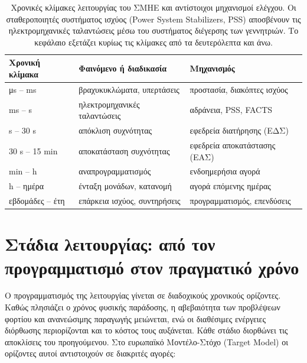 \begin{table}[!htbp]
\centering
\begin{tabular}{lll}
\hline
Χρονική κλίμακα & Φαινόμενο ή διαδικασία & Μηχανισμός \\
\hline
μs -- ms   & βραχυκυκλώματα, υπερτάσεις   & προστασία, διακόπτες ισχύος \\
ms -- s    & ηλεκτρομηχανικές ταλαντώσεις & αδράνεια, PSS, FACTS \\
s -- 30 s  & απόκλιση συχνότητας          & εφεδρεία διατήρησης (ΕΔΣ) \\
30 s -- 15 min & αποκατάσταση συχνότητας  & εφεδρεία αποκατάστασης (ΕΑΣ) \\
min -- h   & αναπρογραμματισμός           & ενδοημερήσια αγορά \\
h -- ημέρα & ένταξη μονάδων, κατανομή     & αγορά επόμενης ημέρας \\
εβδομάδες -- έτη & επάρκεια ισχύος, συντηρήσεις & προγραμματισμός, επενδύσεις \\
\hline
\end{tabular}
\caption{Χρονικές κλίμακες λειτουργίας του ΣΜΗΕ και αντίστοιχοι μηχανισμοί ελέγχου. Οι
σταθεροποιητές συστήματος ισχύος (Power System Stabilizers, PSS) αποσβένουν τις
ηλεκτρομηχανικές ταλαντώσεις μέσω του συστήματος διέγερσης των γεννητριών. Το
κεφάλαιο εξετάζει κυρίως τις κλίμακες από τα δευτερόλεπτα και άνω.}
\label{tab:chronikes-klimakes}
\end{table}

\section{Στάδια λειτουργίας: από τον προγραμματισμό στον πραγματικό χρόνο}
\label{sec:stages}

Ο προγραμματισμός της λειτουργίας γίνεται σε διαδοχικούς χρονικούς ορίζοντες. Καθώς
πλησιάζει ο χρόνος φυσικής παράδοσης, η αβεβαιότητα των προβλέψεων φορτίου και ανανεώσιμης
παραγωγής μειώνεται, ενώ οι διαθέσιμες ενέργειες διόρθωσης περιορίζονται και το κόστος τους
αυξάνεται. Κάθε στάδιο διορθώνει τις αποκλίσεις του προηγούμενου. Στο ευρωπαϊκό
Μοντέλο-Στόχο (Target Model) οι ορίζοντες αυτοί αντιστοιχούν σε διακριτές αγορές:

